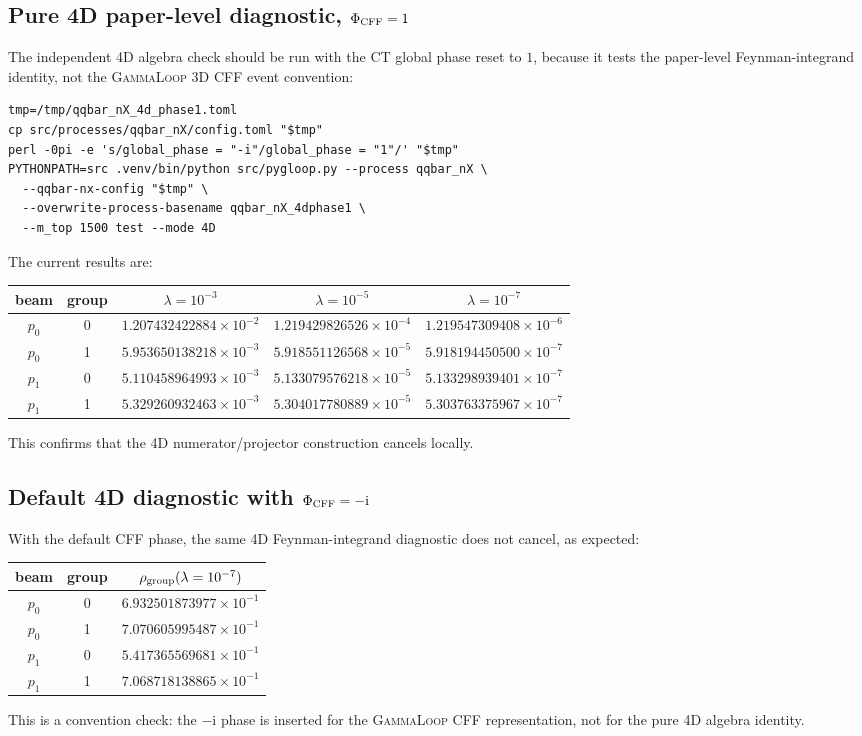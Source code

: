 \documentclass[11pt]{article}
\newcommand{\ii}{\mathrm{i}}
\newcommand{\GammaLoop}{\textsc{GammaLoop}}
\begin{document}
\subsection[Pure 4D paper-level diagnostic, Phi CFF = 1]{Pure 4D paper-level diagnostic, \(\Phi_{\rm CFF}=1\)}

The independent 4D algebra check should be run with the CT global phase reset
to \(1\), because it tests the paper-level Feynman-integrand identity, not the
\GammaLoop{} 3D CFF event convention:
\begin{lstlisting}
tmp=/tmp/qqbar_nX_4d_phase1.toml
cp src/processes/qqbar_nX/config.toml "$tmp"
perl -0pi -e 's/global_phase = "-i"/global_phase = "1"/' "$tmp"
PYTHONPATH=src .venv/bin/python src/pygloop.py --process qqbar_nX \
  --qqbar-nx-config "$tmp" \
  --overwrite-process-basename qqbar_nX_4dphase1 \
  --m_top 1500 test --mode 4D
\end{lstlisting}
The current results are:
\begin{center}
\begin{tabular}{ccccc}
\toprule
beam & group & \(\lambda=10^{-3}\) & \(\lambda=10^{-5}\) & \(\lambda=10^{-7}\)\\
\midrule
\(p_0\) & 0 & \(1.207432422884\times10^{-2}\) & \(1.219429826526\times10^{-4}\) & \(1.219547309408\times10^{-6}\)\\
\(p_0\) & 1 & \(5.953650138218\times10^{-3}\) & \(5.918551126568\times10^{-5}\) & \(5.918194450500\times10^{-7}\)\\
\(p_1\) & 0 & \(5.110458964993\times10^{-3}\) & \(5.133079576218\times10^{-5}\) & \(5.133298939401\times10^{-7}\)\\
\(p_1\) & 1 & \(5.329260932463\times10^{-3}\) & \(5.304017780889\times10^{-5}\) & \(5.303763375967\times10^{-7}\)\\
\bottomrule
\end{tabular}
\end{center}
This confirms that the 4D numerator/projector construction cancels locally.

\subsection[Default 4D diagnostic with Phi CFF = -i]{Default 4D diagnostic with \(\Phi_{\rm CFF}=-\ii\)}

With the default CFF phase, the same 4D Feynman-integrand diagnostic does not
cancel, as expected:
\begin{center}
\begin{tabular}{ccc}
\toprule
beam & group & \(\rho_{\rm group}(\lambda=10^{-7})\)\\
\midrule
\(p_0\) & 0 & \(6.932501873977\times10^{-1}\)\\
\(p_0\) & 1 & \(7.070605995487\times10^{-1}\)\\
\(p_1\) & 0 & \(5.417365569681\times10^{-1}\)\\
\(p_1\) & 1 & \(7.068718138865\times10^{-1}\)\\
\bottomrule
\end{tabular}
\end{center}
This is a convention check: the \(-\ii\) phase is inserted for the
\GammaLoop{} CFF representation, not for the pure 4D algebra identity.
\end{document}
